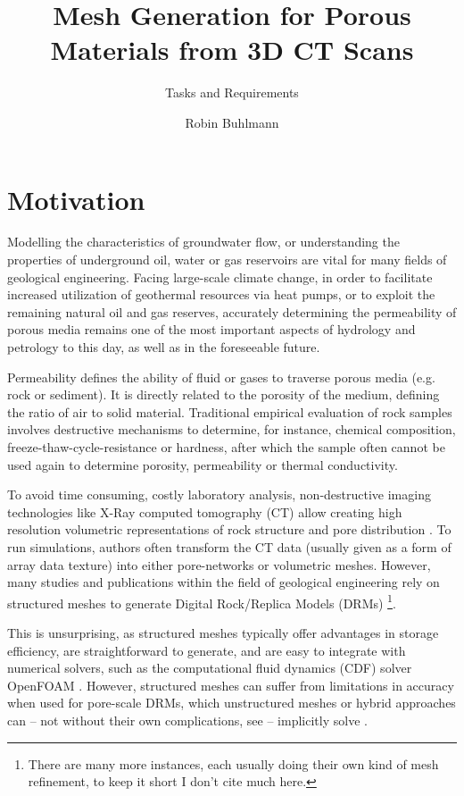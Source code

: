 \documentclass[
	ngerman,
	accentcolor=9c,
	type=intern,
	marginpar=false
	]{tudapub}
\begin{document}
\title{Mesh Generation for Porous Materials from 3D CT Scans}
\subtitle{Tasks and Requirements}
\author{Robin Buhlmann}

\maketitle

\section{Motivation}
Modelling the characteristics of groundwater flow, or understanding the properties of underground oil, water or gas reservoirs are vital for many fields of geological engineering. Facing large-scale climate change, in order to facilitate increased utilization of geothermal resources via heat pumps, or to exploit the remaining natural oil and gas reserves, accurately determining the permeability of porous media remains one of the most important aspects of hydrology and petrology to this day, as well as in the foreseeable future.\par

Permeability defines the ability of fluid or gases to traverse porous media (e.g. rock or sediment). It is directly related to the porosity of the medium, defining the ratio of air to solid material. Traditional empirical evaluation of rock samples involves destructive mechanisms to determine, for instance, chemical composition, freeze-thaw-cycle-resistance or hardness, after which the sample often cannot be used again to determine porosity, permeability or thermal conductivity.\par

To avoid time consuming, costly laboratory analysis, non-destructive imaging technologies like X-Ray computed tomography (CT) allow creating high resolution volumetric representations of rock structure and pore distribution \cite{iassonov_segmentation_2009}. To run simulations, authors often transform the CT data (usually given as a form of array data texture) into either pore-networks or volumetric meshes. However, many studies and publications within the field of geological engineering rely on structured meshes to generate Digital Rock/Replica Models (DRMs) \cite{guibert_computational_2015}\footnote{There are many more instances, each usually doing their own kind of mesh refinement, to keep it short I don't cite much here.}.

This is unsurprising, as structured meshes typically offer advantages in storage efficiency, are straightforward to generate, and are easy to integrate with numerical solvers, such as the computational fluid dynamics (CDF) solver OpenFOAM \cite{noauthor_openfoam_2024}. However, structured meshes can suffer from limitations in accuracy when used for pore-scale DRMs, which unstructured meshes or hybrid approaches can -- not without their own complications, see \textcite{dixon_systematic_2013} -- implicitly solve \cite{hammouti_error_2024}.
\end{document}
